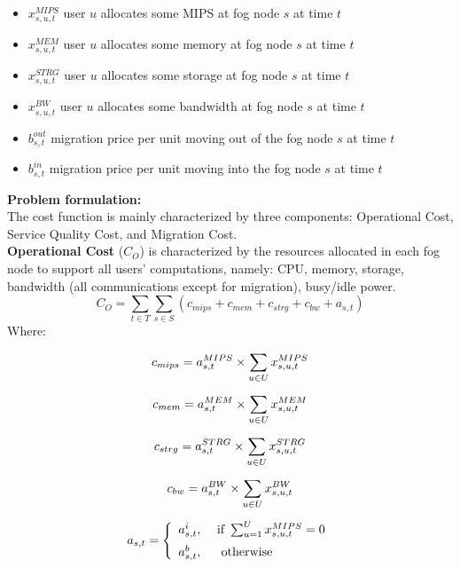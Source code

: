 \documentclass{article}
\begin{document}
\begin{itemize}
    \item $x^{MIPS}_{s,u,t}$ user $u$ allocates some MIPS at fog node $s$ at time $t$
    \item $x^{MEM}_{s,u,t}$ user $u$ allocates some memory at fog node $s$ at time $t$
    \item $x^{STRG}_{s,u,t}$ user $u$ allocates some storage at fog node $s$ at time $t$
    \item $x^{BW}_{s,u,t}$ user $u$ allocates some bandwidth at fog node $s$ at time $t$\\
    
    \item $b^{out}_{s,t}$ migration price per unit moving out of the fog node $s$ at time $t$
    \item $b^{in}_{s,t}$ migration price per unit moving into the fog node $s$ at time $t$
\end{itemize}

\pagebreak
\noindent\textbf{Problem formulation:}\\[6pt]
The cost function is mainly characterized by three components: Operational Cost, Service Quality Cost, and Migration Cost.\\[6pt]

\noindent\textbf{Operational Cost} ($C_O$) is characterized by the resources allocated in each fog node to support all users' computations, namely: CPU, memory, storage, bandwidth (all communications except for migration), busy/idle power.
\begin{equation}
    C_O = \sum_{t \in T} \sum_{s \in S} \left( c_{mips} + c_{mem} + c_ {strg} + c_{bw} + a_{s,t}\right)
\end{equation}
Where:

\begin{gather}
    c_{mips} = a^{MIPS}_{s,t} \times \sum_{u \in U} x^{MIPS}_{s,u,t}\\[6pt]
    c_{mem} =  a^{MEM}_{s,t} \times \sum_{u \in U} x^{MEM}_{s,u,t}\\[6pt]
    c_ {strg} =  a^{STRG}_{s,t} \times \sum_{u \in U} x^{STRG}_{s,u,t}\\[6pt]
    c_{bw} = a^{BW}_{s,t} \times \sum_{u \in U} x^{BW}_{s,u,t}\\[6pt]
    a_{s,t} = \left\{ \begin{array}{ll} a^i_{s,t}, & \text{ if }\sum_{u=1}^Ux^{MIPS}_{s,u,t} = 0 \\[6pt]
    a^b_{s,t}, & \text{ \text{ otherwise } } \end{array} \right.
\end{gather}
\end{document}
